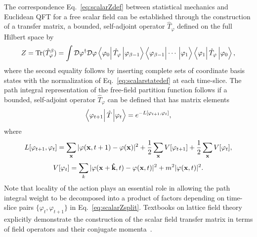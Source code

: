 The correspondence Eq.~\eqref{eq:scalarZdef} between statistical mechanics and Euclidean QFT for a free scalar field
can be established through the construction of a transfer matrix, a bounded, self-adjoint operator $\hat{T}_\varphi$ defined on the full Hilbert space by
\begin{equation}
  Z = \tr(\hat{T}_\varphi^{\beta}) = \int \mathcal{D}\varphi^\dagger\mathcal{D}\varphi \mbraket{\varphi_0}{\hat{T}_\varphi}{\varphi_{\beta-1}}\mbraket{\varphi_{\beta-1}}{\cdots\vphantom{\hat{T}_\varphi}}{\varphi_1}\mbraket{\varphi_1}{\hat{T}_\varphi}{\varphi_0},
  \label{eq:scalarZsplit}
\end{equation}
where the second equality follows by inserting complete sets of coordinate basis states with the normalization of Eq.~\eqref{eq:scalarstatedef} at each time-slice.
The path integral representation of the free-field partition function follows if a bounded, self-adjoint operator $\hat{T}_\varphi$ can be defined that has matrix elements
\begin{equation}
  \mbraket{\varphi_{t+1}}{\hat{T}}{\varphi_t} =  e^{-L[\varphi_{t+1},\varphi_t]},
  \label{eq:scalarT}
\end{equation}
where 
\begin{equation}
  L[\varphi_{t+1},\varphi_t] = \sum_{\mathbf{x}} |\varphi(\mathbf{x},t+1) - \varphi(\mathbf{x})|^2 + \frac{1}{2}\sum_{\mathbf{x}} V[\varphi_{t+1}] + \frac{1}{2}\sum_{\mathbf{x}} V[\varphi_t],
  \label{eq:scalarL}
\end{equation}
\begin{equation}
  V[\varphi_t] = \sum_k |\varphi(\mathbf{x} + \mathbf{\hat{k}},t) - \varphi(\mathbf{x},t)|^2 + m^2 |\varphi(\mathbf{x},t)|^2.
  \label{eq:scalarV}
\end{equation}
Note that locality of the action plays an essential role in allowing the path integral weight to be decomposed into a product of factors depending on time-slice pairs $\{\varphi_t,\varphi_{t+1}\}$ in Eq.~\eqref{eq:scalarZsplit}.
Textbooks on lattice field theory explicitly demonstrate the construction of the scalar field transfer matrix in terms of field operators and their conjugate momenta~\cite{creutz:1983quarks,smit:2002introduction,montvay:1997quantum}.

